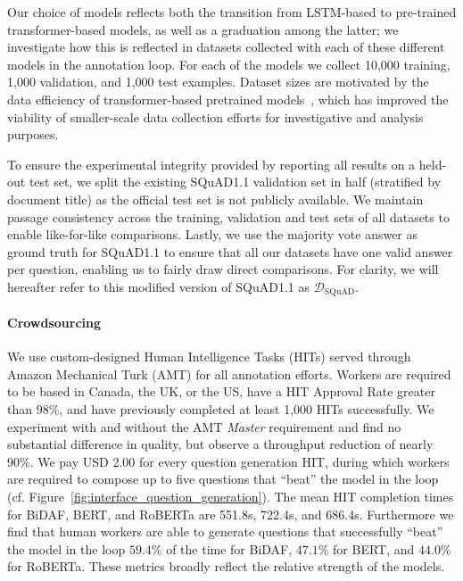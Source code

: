 \documentclass[11pt,a4paper]{article}
\newcommand{\dataset}[1]{\ensuremath{\mathcal{D_{\mathrm{#1}}}}}
\newcommand{\squadone}{SQuAD1.1}
\newif\ifarxiv
\begin{document}
{\begin{table*}[!ht]
\end{table*}


Our choice of models reflects both the transition from LSTM-based to pre-trained transformer-based models, as well as a graduation among the latter; we investigate how this is reflected in datasets collected with each of these different models in the annotation loop. 
For each of the models we collect 10,000 training, 1,000 validation, and 1,000 test examples. Dataset sizes are motivated by the data efficiency of transformer-based pretrained models~\cite{devlin2019bert,liu2019roberta}, which has improved the viability of smaller-scale data collection efforts for investigative and analysis purposes.


To ensure the experimental integrity provided by reporting all results on a held-out test set, we split the existing \squadone{} validation set in half (stratified by document title) as the official test set is not publicly available. 
We maintain passage consistency across the training, validation and test sets of all datasets to enable like-for-like comparisons.
Lastly, we use the majority vote answer as ground truth for \squadone{} to
ensure that all our datasets have one valid answer per question, enabling us to fairly draw direct comparisons.
For clarity, we will hereafter refer to this modified version of \squadone{} as \dataset{SQuAD}. 
}


\paragraph{Crowdsourcing}
We use custom-designed Human Intelligence Tasks (HITs) served through Amazon Mechanical Turk (AMT) for all annotation efforts\ifarxiv (see Appendix~\ref{sec:appendix_dataset_construction})\fi.
Workers are required to be based in Canada, the UK, or the US, have a HIT Approval Rate greater than $98\%$, and have previously completed at least 1,000 HITs successfully. 
We experiment with and without the AMT \emph{Master} requirement and find no substantial difference in quality, but observe a throughput reduction of nearly 90\%.
We pay USD 2.00 for every question generation HIT, during which workers are required to compose up to five questions that ``beat'' the model in the loop (cf. Figure~\ref{fig:interface_question_generation}). 
The mean HIT completion times for BiDAF, BERT, and RoBERTa are 551.8s, 722.4s, and 686.4s.
Furthermore we find that human workers are able to generate questions that successfully ``beat'' the model in the loop $59.4\%$ of the time for BiDAF, $47.1\%$ for BERT, and $44.0\%$ for RoBERTa.
These metrics broadly reflect the relative strength of the models.
\end{document}
